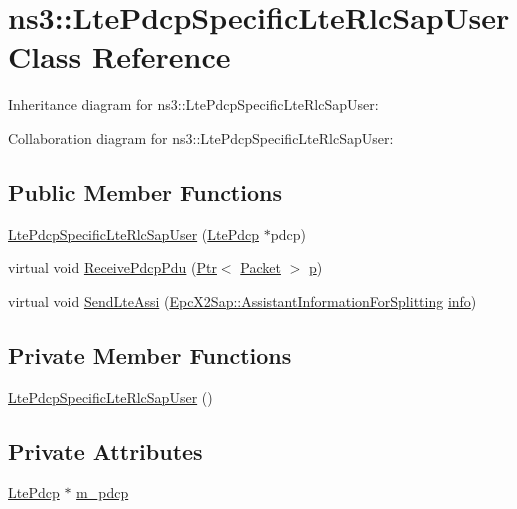 \hypertarget{classns3_1_1LtePdcpSpecificLteRlcSapUser}{}\section{ns3\+:\+:Lte\+Pdcp\+Specific\+Lte\+Rlc\+Sap\+User Class Reference}
\label{classns3_1_1LtePdcpSpecificLteRlcSapUser}


Inheritance diagram for ns3\+:\+:Lte\+Pdcp\+Specific\+Lte\+Rlc\+Sap\+User\+:


Collaboration diagram for ns3\+:\+:Lte\+Pdcp\+Specific\+Lte\+Rlc\+Sap\+User\+:
\subsection*{Public Member Functions}
\begin{DoxyCompactItemize}
\item 
\hyperlink{classns3_1_1LtePdcpSpecificLteRlcSapUser_aa9501ab90f5591d270ed62f80142cbf3}{Lte\+Pdcp\+Specific\+Lte\+Rlc\+Sap\+User} (\hyperlink{classns3_1_1LtePdcp}{Lte\+Pdcp} $\ast$pdcp)
\item 
virtual void \hyperlink{classns3_1_1LtePdcpSpecificLteRlcSapUser_a6cd9bae35c5551566d0e41ae2e6866f0}{Receive\+Pdcp\+Pdu} (\hyperlink{classns3_1_1Ptr}{Ptr}$<$ \hyperlink{classns3_1_1Packet}{Packet} $>$ \hyperlink{lte__link__budget__x2__handover__measures_8m_ac9de518908a968428863f829398a4e62}{p})
\item 
virtual void \hyperlink{classns3_1_1LtePdcpSpecificLteRlcSapUser_a380aa87c6a12b4673d773d922ca4572b}{Send\+Lte\+Assi} (\hyperlink{structns3_1_1EpcX2Sap_1_1AssistantInformationForSplitting}{Epc\+X2\+Sap\+::\+Assistant\+Information\+For\+Splitting} \hyperlink{classns3_1_1LteRlcSapUser_ae5c93c1d5c538c4f8cec3ad4ecbd898a}{info})
\end{DoxyCompactItemize}
\subsection*{Private Member Functions}
\begin{DoxyCompactItemize}
\item 
\hyperlink{classns3_1_1LtePdcpSpecificLteRlcSapUser_a4f9565acae99accb199fe34b44a838a7}{Lte\+Pdcp\+Specific\+Lte\+Rlc\+Sap\+User} ()
\end{DoxyCompactItemize}
\subsection*{Private Attributes}
\begin{DoxyCompactItemize}
\item 
\hyperlink{classns3_1_1LtePdcp}{Lte\+Pdcp} $\ast$ \hyperlink{classns3_1_1LtePdcpSpecificLteRlcSapUser_a85ad280cd666851521e7c51dee47d43b}{m\+\_\+pdcp}
\end{DoxyCompactItemize}
